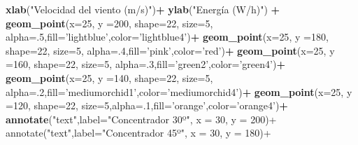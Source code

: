 \documentclass[]{article}
\newenvironment{Shaded}{\begin{snugshade}}{\end{snugshade}}
\newcommand{\KeywordTok}[1]{\textcolor[rgb]{0.13,0.29,0.53}{\textbf{#1}}}
\newcommand{\DataTypeTok}[1]{\textcolor[rgb]{0.13,0.29,0.53}{#1}}
\newcommand{\DecValTok}[1]{\textcolor[rgb]{0.00,0.00,0.81}{#1}}
\newcommand{\StringTok}[1]{\textcolor[rgb]{0.31,0.60,0.02}{#1}}
\newcommand{\OperatorTok}[1]{\textcolor[rgb]{0.81,0.36,0.00}{\textbf{#1}}}
\newcommand{\NormalTok}[1]{#1}
\begin{document}
\begin{Shaded}
\begin{Highlighting}[]
{{{{{{\StringTok{    }\KeywordTok{xlab}\NormalTok{(}\StringTok{"Velocidad del viento (m/s)"}\NormalTok{)}\OperatorTok{+}
\StringTok{    }\KeywordTok{ylab}\NormalTok{(}\StringTok{"Energía (W/h)"}\NormalTok{) }\OperatorTok{+}
\StringTok{    }\KeywordTok{geom_point}\NormalTok{(}\DataTypeTok{x=}\DecValTok{25}\NormalTok{, }\DataTypeTok{y =}\DecValTok{200}\NormalTok{, }\DataTypeTok{shape=}\DecValTok{22}\NormalTok{, }\DataTypeTok{size=}\DecValTok{5}\NormalTok{, }\DataTypeTok{alpha=}\NormalTok{.}\DecValTok{5}\NormalTok{,}\DataTypeTok{fill=}\StringTok{'lightblue'}\NormalTok{,}\DataTypeTok{color=}\StringTok{'lightblue4'}\NormalTok{)}\OperatorTok{+}
\StringTok{    }\KeywordTok{geom_point}\NormalTok{(}\DataTypeTok{x=}\DecValTok{25}\NormalTok{, }\DataTypeTok{y =}\DecValTok{180}\NormalTok{, }\DataTypeTok{shape=}\DecValTok{22}\NormalTok{, }\DataTypeTok{size=}\DecValTok{5}\NormalTok{, }\DataTypeTok{alpha=}\NormalTok{.}\DecValTok{4}\NormalTok{,}\DataTypeTok{fill=}\StringTok{'pink'}\NormalTok{,}\DataTypeTok{color=}\StringTok{'red'}\NormalTok{)}\OperatorTok{+}
\StringTok{    }\KeywordTok{geom_point}\NormalTok{(}\DataTypeTok{x=}\DecValTok{25}\NormalTok{, }\DataTypeTok{y =}\DecValTok{160}\NormalTok{, }\DataTypeTok{shape=}\DecValTok{22}\NormalTok{, }\DataTypeTok{size=}\DecValTok{5}\NormalTok{, }\DataTypeTok{alpha=}\NormalTok{.}\DecValTok{3}\NormalTok{,}\DataTypeTok{fill=}\StringTok{'green2'}\NormalTok{,}\DataTypeTok{color=}\StringTok{'green4'}\NormalTok{)}\OperatorTok{+}
\StringTok{    }\KeywordTok{geom_point}\NormalTok{(}\DataTypeTok{x=}\DecValTok{25}\NormalTok{, }\DataTypeTok{y =}\DecValTok{140}\NormalTok{, }\DataTypeTok{shape=}\DecValTok{22}\NormalTok{, }\DataTypeTok{size=}\DecValTok{5}\NormalTok{, }\DataTypeTok{alpha=}\NormalTok{.}\DecValTok{2}\NormalTok{,}\DataTypeTok{fill=}\StringTok{'mediumorchid1'}\NormalTok{,}\DataTypeTok{color=}\StringTok{'mediumorchid4'}\NormalTok{)}\OperatorTok{+}\StringTok{ }
\StringTok{    }\KeywordTok{geom_point}\NormalTok{(}\DataTypeTok{x=}\DecValTok{25}\NormalTok{, }\DataTypeTok{y =}\DecValTok{120}\NormalTok{, }\DataTypeTok{shape=}\DecValTok{22}\NormalTok{, }\DataTypeTok{size=}\DecValTok{5}\NormalTok{,}\DataTypeTok{alpha=}\NormalTok{.}\DecValTok{1}\NormalTok{,}\DataTypeTok{fill=}\StringTok{'orange'}\NormalTok{,}\DataTypeTok{color=}\StringTok{'orange4'}\NormalTok{)}\OperatorTok{+}
\StringTok{    }\KeywordTok{annotate}\NormalTok{(}\StringTok{"text"}\NormalTok{,}\DataTypeTok{label=}\StringTok{"Concentrador 30º", x = 30, y = 200)+}
\StringTok{    annotate("}\NormalTok{text}\StringTok{",label="}\NormalTok{Concentrador }\DecValTok{45}\NormalTok{º}\StringTok{", x = 30, y = 180)+}
}}}}}}
\end{Highlighting}
\end{Shaded}
\end{document}
